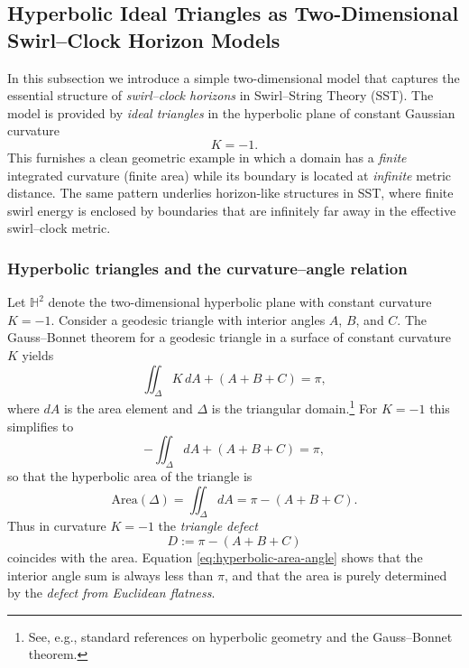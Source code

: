 \documentclass[10pt,reprint,aps,onecolumn,nofootinbib]{revtex4-2}
\begin{document}
\subsection{Hyperbolic Ideal Triangles as Two-Dimensional Swirl–Clock Horizon Models}
\label{subsec:hyperbolic-ideal-triangle-sst}

In this subsection we introduce a simple two-dimensional model that captures the essential structure of \emph{swirl–clock horizons} in Swirl–String Theory (SST). The model is provided by \emph{ideal triangles} in the hyperbolic plane of constant Gaussian curvature
\begin{equation}
    K = -1.
\end{equation}
This furnishes a clean geometric example in which a domain has a \emph{finite} integrated curvature (finite area) while its boundary is located at \emph{infinite} metric distance. The same pattern underlies horizon-like structures in SST, where finite swirl energy is enclosed by boundaries that are infinitely far away in the effective swirl–clock metric.

\subsubsection{Hyperbolic triangles and the curvature--angle relation}

    Let $\mathbb{H}^2$ denote the two-dimensional hyperbolic plane with constant curvature $K=-1$. Consider a geodesic triangle with interior angles $A$, $B$, and $C$. The Gauss--Bonnet theorem for a geodesic triangle in a surface of constant curvature $K$ yields
    \begin{equation}
        \iint_{\Delta} K \, dA + (A + B + C) = \pi,
    \end{equation}
    where $dA$ is the area element and $\Delta$ is the triangular domain.\footnote{See, e.g., standard references on hyperbolic geometry and the Gauss--Bonnet theorem.\cite{doCarmo-diff-geom-2016,Ratcliffe-hyperbolic-2006,Thurston-3manifolds-1997}}
    For $K=-1$ this simplifies to
    \begin{equation}
        - \iint_{\Delta} dA + (A + B + C) = \pi,
    \end{equation}
    so that the hyperbolic area of the triangle is
    \begin{equation}
        \text{Area}(\Delta)
        = \iint_{\Delta} dA
        = \pi - (A + B + C).
        \label{eq:hyperbolic-area-angle}
    \end{equation}
    Thus in curvature $K = -1$ the \emph{triangle defect}
    \begin{equation}
        D := \pi - (A + B + C)
    \end{equation}
    coincides with the area. Equation \eqref{eq:hyperbolic-area-angle} shows that the interior angle sum is always less than $\pi$, and that the area is purely determined by the \emph{defect from Euclidean flatness}.
\end{document}
